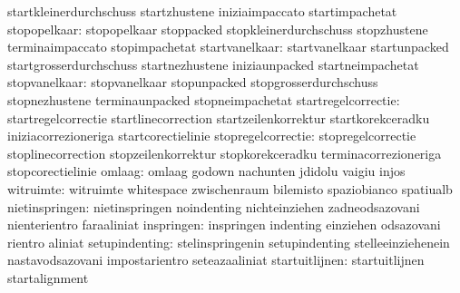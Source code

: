                                   startkleinerdurchschuss          startzhustene
                                  iniziaimpaccato                  startimpachetat
                    stopopelkaar: stopopelkaar                     stoppacked
                                  stopkleinerdurchschuss           stopzhustene
                                  terminaimpaccato                 stopimpachetat
                  startvanelkaar: startvanelkaar                   startunpacked
                                  startgrosserdurchschuss          startnezhustene
                                  iniziaunpacked                   startneimpachetat
                   stopvanelkaar: stopvanelkaar                    stopunpacked
                                  stopgrosserdurchschuss           stopnezhustene
                                  terminaunpacked                  stopneimpachetat
             startregelcorrectie: startregelcorrectie              startlinecorrection
                                  startzeilenkorrektur             startkorekceradku
                                  iniziacorrezioneriga             startcorectielinie
              stopregelcorrectie: stopregelcorrectie               stoplinecorrection
                                  stopzeilenkorrektur              stopkorekceradku
                                  terminacorrezioneriga            stopcorectielinie
                          omlaag: omlaag                           godown
                                  nachunten                        jdidolu
                                  vaigiu                           injos
                       witruimte: witruimte                        whitespace
                                  zwischenraum                     bilemisto
                                  spaziobianco                     spatiualb
                  nietinspringen: nietinspringen                   noindenting
                                  nichteinziehen                   zadneodsazovani
                                  nienterientro                    faraaliniat
                      inspringen: inspringen                       indenting
                                  einziehen                        odsazovani
                                  rientro                          aliniat
                  setupindenting: stelinspringenin                 setupindenting
                                  stelleeinziehenein               nastavodsazovani
                                  impostarientro                   seteazaaliniat
                  startuitlijnen: startuitlijnen                   startalignment
